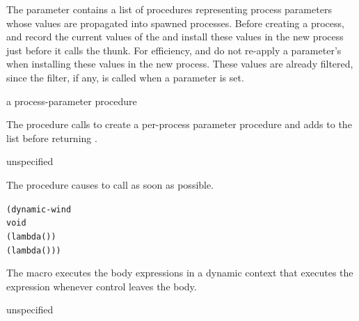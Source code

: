 The  parameter contains a list of procedures
representing process parameters whose values are propagated into spawned
processes.
Before creating a process,  and 
record the current values of the 
and install these values in the new process just before it calls
the thunk.
For efficiency,  and  do not re-apply a
parameter's  when installing these values in the new process.
These values are already filtered, since the filter, if any, is called
when a parameter is set.

\begin{procedure}
\end{procedure}
\returns{} a process-parameter procedure

The  procedure calls
 to create a per-process
parameter procedure  and adds  to the
 list before returning .

\begin{procedure}
\end{procedure}
\returns{} unspecified

The  procedure causes  to call
 as soon as possible.

\begin{syntax}
\end{syntax}
\expandsto{}\begin{alltt}\antipar
(dynamic-wind
  void
  (lambda ()   \etc{})
  (lambda () ))\end{alltt}

The  macro executes the body expressions 
 \etc{} in a dynamic context that executes the 
expression whenever control leaves the body.

\begin{procedure}
\end{procedure}
\returns{} unspecified

